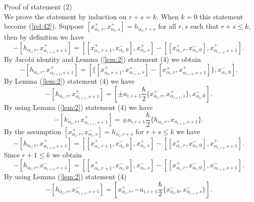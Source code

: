 \documentclass[english]{elsarticle}
\numberwithin{equation}{section}
\begin{document}
Proof of statement (2)\\
We prove the statement by induction on $r+s=k$. When $k=0$ this statement become (\ref{rel:42}). Suppose $[x_{\alpha_i,r}^+,x_{\alpha_i,s}^+]=h_{\alpha_i,r+s}$ for all $r,s$ such that $r+s\leq k$, then by definition we have
\begin{equation}
[h_{\alpha_i,r+1},x_{\alpha_{i+1},s}^+]-[h_{\alpha_i,r},x_{\alpha_{i+1},s+1}^+]=[[x_{\alpha_{i},r+1}^+,x_{\alpha_i,0}^-],x_{\alpha_{i},s}^+]-[[x_{\alpha_{i},r}^+,x_{\alpha_i,0}^-],x_{\alpha_{i+1},s+1}^+].
\end{equation}
By Jacobi identity and Lemma (\ref{lem:2}) statement (4) we obtain
\begin{equation}
[h_{\alpha_i,r+1},x_{\alpha_{i+1},s}^+]-[h_{\alpha_i,r},x_{\alpha_{i+1},s+1}^+] = [\{[x_{\alpha_i,r+1}^+,x_{\alpha_{i+1},s}^+]-[x_{\alpha_i,r}^+,x_{\alpha_{i+1},s+1}^+]\},x_{\alpha_i,0}^-].
\end{equation}
By Lemma (\ref{lem:2}) statement (4) we have
\begin{equation}
    [h_{\alpha_i,r+1},x_{\alpha_{i+1},s}^+]-[h_{\alpha_i,r},x_{\alpha_{i+1},s+1}^+] = [\pm a_{i,i+1}\frac{\hbar}{2}\{x_{\alpha_i,r}^+,x_{\alpha_{i+1},s}^+\},x_{\alpha_i,0}^-].
\end{equation}
By using Lemma (\ref{lem:2}) statement (4) we have
\begin{equation}
    [h_{\alpha_i,r+1},x_{\alpha_{i+1},s}^+]-[h_{\alpha_i,r},x_{\alpha_{i+1},s+1}^+]= \pm a_{i,i+1}\frac{\hbar}{2}\{h_{\alpha_i,r},x_{\alpha_{i+1},s+1}\}.
\end{equation}
By the assumption $[x_{\alpha_i,r}^+,x_{\alpha_i,s}^-]=h_{\alpha_i,r+s}$ for $r+s\leq k$ we have
\begin{equation}
    [h_{\alpha_i,r+1},x_{\alpha_{i+1},s}^+]-[h_{\alpha_i,r},x_{\alpha_{i+1},s+1}^+] = [[x_{\alpha_{i},r+1}^+,x_{\alpha_i,0}^-],x_{\alpha_{i},s}^+]-[[x_{\alpha_{i},r}^+,x_{\alpha_i,0}^-],x_{\alpha_{i+1},s+1}^+].
\end{equation}
Since $r+1\leq k$ we obtain
\begin{equation}
[h_{\alpha_i,r+1},x_{\alpha_{i+1},s}^-]-[h_{\alpha_i,r},x_{\alpha_{i+1},s+1}^-]= [[x_{\alpha_{i},r+1}^+,x_{\alpha_i,0}^-],x_{\alpha_{i},s}^-]- [[x_{\alpha_{i},r}^+,x_{\alpha_i,0}^-],x_{\alpha_{i+1},s+1}^-].
\end{equation}
By using Lemma (\ref{lem:2}) statement (4)
\begin{equation}
[h_{\alpha_i,r+1},x_{\alpha_{i+1},s}^-]-[h_{\alpha_i,r},x_{\alpha_{i+1},s+1}^-]= [x_{\alpha_i,r}^+,-a_{i,i+1}\frac{\hbar}{2}\{x_{\alpha_i,0}^-,x_{\alpha_{i+1},s}^-\}].
\end{equation}
\end{document}
